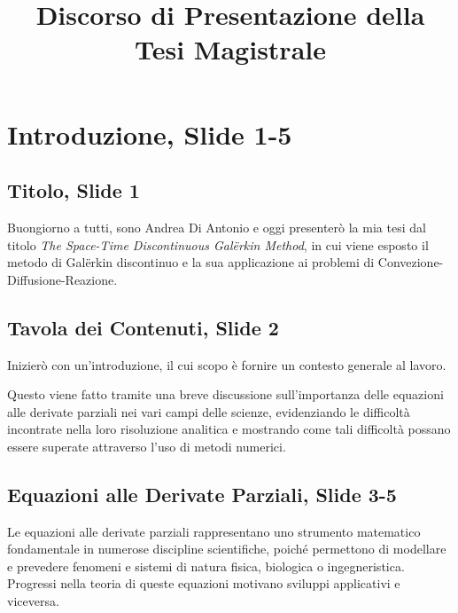 \documentclass[12pt]{article}
\title{Discorso di Presentazione della Tesi Magistrale \\ \documenttitle}
\begin{document}

    \maketitle
    \tableofcontents


    \newpage
    
    \newpage
    \section{Introduzione, Slide 1-5}

    \subsection{Titolo, Slide 1}

    Buongiorno a tutti, sono Andrea Di Antonio e oggi presenterò la mia tesi dal titolo \textit{The Space-Time Discontinuous Galërkin Method}, in cui viene esposto il metodo di Galërkin discontinuo e la sua applicazione ai problemi di Convezione-Diffusione-Reazione.

    \subsection{Tavola dei Contenuti, Slide 2}

    Inizierò con un'introduzione, il cui scopo è fornire un contesto generale al lavoro. 
    
    {\color{gray} Questo viene fatto tramite una breve discussione sull'importanza delle equazioni alle derivate parziali nei vari campi delle scienze, evidenziando le difficoltà incontrate nella loro risoluzione analitica e mostrando come tali difficoltà possano essere superate attraverso l'uso di metodi numerici.}

    \subsection{Equazioni alle Derivate Parziali, Slide 3-5}

    Le equazioni alle derivate parziali rappresentano uno strumento matematico fondamentale in numerose discipline scientifiche, poiché permettono di modellare e prevedere fenomeni e sistemi di natura fisica, biologica o ingegneristica. Progressi nella teoria di queste equazioni motivano sviluppi applicativi e viceversa.
\end{document}
